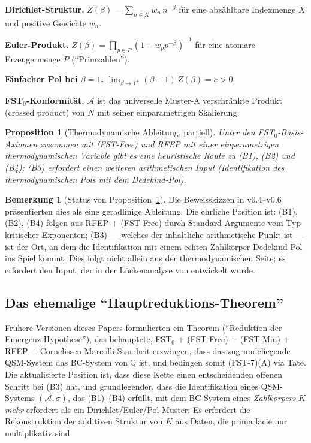 \documentclass[11pt,a4paper]{article}
\theoremstyle{plain}
\newtheorem{proposition}[theorem]{Proposition}
\theoremstyle{definition}
\newtheorem{remark}[theorem]{Bemerkung}
\newcommand{\Q}{\mathbb{Q}}
\begin{document}
\begin{description}[leftmargin=*,style=nextline]
\item[(B1)] \textbf{Dirichlet-Struktur.} $Z(\beta) = \sum_{n \in X}
  w_n\, n^{-\beta}$ für eine abzählbare Indexmenge $X$ und positive
  Gewichte $w_n$.
\item[(B2)] \textbf{Euler-Produkt.} $Z(\beta) = \prod_{p \in P}
  (1-w_p p^{-\beta})^{-1}$ für eine atomare Erzeugermenge $P$
  (``Primzahlen'').
\item[(B3)] \textbf{Einfacher Pol bei $\beta=1$.} $\lim_{\beta \to 1^+}
  (\beta-1)\, Z(\beta) = c > 0$.
\item[(B4)] \textbf{FST$_0$-Konformität.} $\mathcal A$ ist das
  universelle Muster-A verschränkte Produkt (crossed product) von $N$
  mit seiner einparametrigen Skalierung.
\end{description}

\begin{proposition}[Thermodynamische Ableitung, partiell]\label{prop:thermo-derivation}
Unter den FST$_0$-Basis-Axiomen zusammen mit (FST-Free) und RFEP mit
einer einparametrigen thermodynamischen Variable gibt es eine heuristische
Route zu (B1), (B2) und (B4); (B3) erfordert einen weiteren arithmetischen Input
(Identifikation des thermodynamischen Pols mit dem Dedekind-Pol).
\end{proposition}

\begin{remark}[Status von Proposition~\ref{prop:thermo-derivation}]
\label{rem:thermo-status}
Die Beweisskizzen in v0.4--v0.6 präsentierten dies als eine geradlinige
Ableitung. Die ehrliche Position ist: (B1), (B2), (B4) folgen aus
RFEP + (FST-Free) durch Standard-Argumente vom Typ kritischer Exponenten;
(B3) --- welches der inhaltliche arithmetische Punkt ist --- ist der Ort, an dem die
Identifikation mit einem echten Zahlkörper-Dedekind-Pol ins Spiel kommt.
Dies folgt nicht allein aus der thermodynamischen Seite; es erfordert den Input,
der in der Lückenanalyse von \cite{L1KAttack} entwickelt wurde.
\end{remark}

\subsection{Das ehemalige ``Hauptreduktions-Theorem''}
\label{sec:former-reduction}

Frühere Versionen dieses Papers formulierten ein Theorem (``Reduktion der
Emergenz-Hypothese''), das behauptete, FST$_0$ + (FST-Free) +
(FST-Min) + RFEP + Cornelissen-Marcolli-Starrheit erzwingen, dass das
zugrundeliegende QSM-System das BC-System von $\Q$ ist, und bedingen somit
(FST-7)(A) via Tate. Die aktualisierte Position ist, dass diese Kette einen
entscheidenden offenen Schritt bei (B3) hat, und grundlegender, dass die
Identifikation eines QSM-Systems $(\mathcal A, \sigma)$, das
(B1)--(B4) erfüllt, mit dem BC-System eines \emph{Zahlkörpers} $K$ \emph{mehr}
erfordert als ein Dirichlet/Euler/Pol-Muster: Es erfordert die Rekonstruktion
der additiven Struktur von $K$ aus Daten, die prima facie nur multiplikativ sind.
\end{document}
